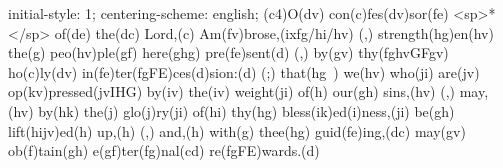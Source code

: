initial-style: 1;
centering-scheme: english;
(c4)O(dv) con(c)fes(dv)sor(fe) <sp>*</sp> of(de) the(dc) Lord,(c) Am(fv)brose,(ixfg/hi/hv) (,) strength(hg)en(hv) the(g) peo(hv)ple(gf) here(ghg) pre(fe)sent(d) (,) by(gv) thy(fghvGFgv) ho(c)ly(dv) in(fe)ter(fgFE)ces(d)sion:(d) (;) that(hg~) we(hv) who(ji) are(jv) op(kv)pressed(jvIHG) by(iv) the(iv) weight(ji) of(h) our(gh) sins,(hv) (,) may,(hv) by(hk) the(j) glo(j)ry(ji) of(hi) thy(hg) bless(ik)ed(i)ness,(ji) be(gh) lift(hijv)ed(h) up,(h) (,) and,(h) with(g) thee(hg) guid(fe)ing,(dc) may(gv) ob(f)tain(gh) e(gf)ter(fg)nal(cd) re(fgFE)wards.(d)
